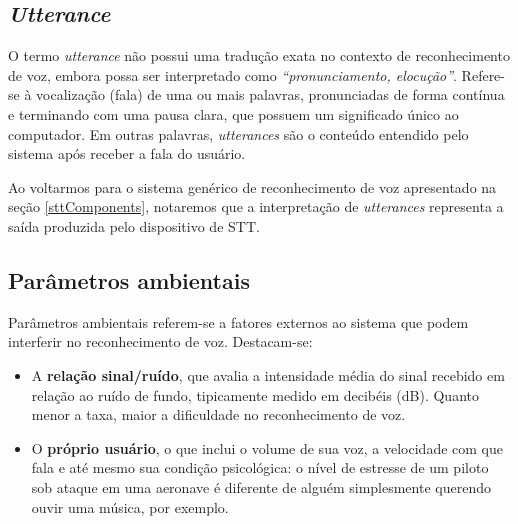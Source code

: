 \subsection{\textit{Utterance}}

O termo \textit{utterance} não possui uma tradução exata no contexto de reconhecimento de voz, embora possa ser interpretado como \textit{``pronunciamento, elocução''}. Refere-se à vocalização (fala) de uma ou mais palavras, pronunciadas de forma contínua e terminando com uma pausa clara, que possuem um significado único ao computador. Em outras palavras, \textit{utterances} são o conteúdo entendido pelo sistema após receber a fala do usuário.

Ao voltarmos para o sistema genérico de reconhecimento de voz apresentado na seção \ref{sttComponents}, notaremos que a interpretação de \textit{utterances} representa a saída produzida pelo dispositivo de STT.


\subsection{Parâmetros ambientais}

Parâmetros ambientais referem-se a fatores externos ao sistema que podem interferir no reconhecimento de voz. Destacam-se:

\begin{itemize}
\item A \textbf{relação sinal/ruído}, que avalia a intensidade média do sinal recebido em relação ao ruído de fundo, tipicamente medido em decibéis (dB). Quanto menor a taxa, maior a dificuldade no reconhecimento de voz.

\item O \textbf{próprio usuário}, o que inclui o volume de sua voz, a velocidade com que fala e até mesmo sua condição psicológica: o nível de estresse de um piloto sob ataque em uma aeronave é diferente de alguém simplesmente querendo ouvir uma música, por exemplo.
\end{itemize}
